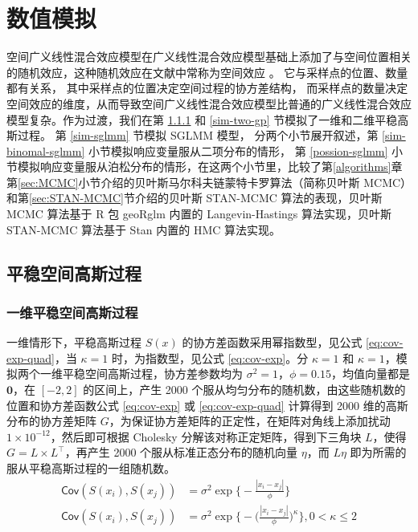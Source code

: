 \documentclass[12pt,a4paper,UTF8,twoside]{book}
\theoremstyle{definition}
\theoremstyle{definition}
\theoremstyle{definition}
\theoremstyle{remark}
\begin{document}
\hypertarget{simulations}{%
\chapter{数值模拟}\label{simulations}}

空间广义线性混合效应模型在广义线性混合效应模型基础上添加了与空间位置相关的随机效应，这种随机效应在文献中常称为空间效应
\citep{Diggle1998}。 它与采样点的位置、数量都有关系，
其中采样点的位置决定空间过程的协方差结构，
而采样点的数量决定空间效应的维度，从而导致空间广义线性混合效应模型比普通的广义线性混合效应模型复杂。作为过渡，我们在第
\ref{sim-one-gp} 和 \ref{sim-two-gp} 节模拟了一维和二维平稳高斯过程。 第
\ref{sim-sglmm} 节模拟 SGLMM 模型， 分两个小节展开叙述，第
\ref{sim-binomal-sglmm} 小节模拟响应变量服从二项分布的情形， 第
\ref{possion-sglmm}
小节模拟响应变量服从泊松分布的情形，在这两个小节里，比较了第\ref{algorithms}章第\ref{sec:MCMC}小节介绍的贝叶斯马尔科夫链蒙特卡罗算法（简称贝叶斯
MCMC）和第\ref{sec:STAN-MCMC}节介绍的贝叶斯 STAN-MCMC 算法的表现，贝叶斯
MCMC 算法基于 R 包 geoRglm 内置的 Langevin-Hastings 算法实现，贝叶斯
STAN-MCMC 算法基于 Stan 内置的 HMC 算法实现。

\hypertarget{spatial-gaussian-processes}{%
\section{平稳空间高斯过程}\label{spatial-gaussian-processes}}

\hypertarget{sim-one-gp}{%
\subsection{一维平稳空间高斯过程}\label{sim-one-gp}}

一维情形下，平稳高斯过程 \(S(x)\) 的协方差函数采用幂指数型，见公式
\eqref{eq:cov-exp-quad}，当 \(\kappa =1\) 时，为指数型，见公式
\eqref{eq:cov-exp}。分 \(\kappa =1\) 和
\(\kappa =1\)，模拟两个一维平稳空间高斯过程，协方差参数均为
\(\sigma^2 = 1\)，\(\phi = 0.15\)，均值向量都是 \(\mathbf{0}\)，在
\([-2,2]\) 的区间上，产生 2000
个服从均匀分布的随机数，由这些随机数的位置和协方差函数公式
\eqref{eq:cov-exp} 或 \eqref{eq:cov-exp-quad} 计算得到 2000
维的高斯分布的协方差矩阵
\(G\)，为保证协方差矩阵的正定性，在矩阵对角线上添加扰动
\(1 \times 10^{-12}\)，然后即可根据 Cholesky
分解该对称正定矩阵，得到下三角块 \(L\)，使得
\(G = L \times L^{\top}\)，再产生 2000 个服从标准正态分布的随机向量
\(\eta\)，而 \(L\eta\) 即为所需的服从平稳高斯过程的一组随机数。
\begin{align}
\mathsf{Cov}(S(x_i), S(x_j)) & = \sigma^2 \exp\big\{ - \frac{|x_{i} - x_{j}|}{ \phi } \big\}  \label{eq:cov-exp} \\
\mathsf{Cov}(S(x_i), S(x_j)) & = \sigma^2 \exp\big\{ -\big( \frac{ |x_{i} - x_{j}| }{ \phi } \big) ^ {\kappa} \big\}, 0 < \kappa \leq 2  \label{eq:cov-exp-quad} 
\end{align}
\end{document}
